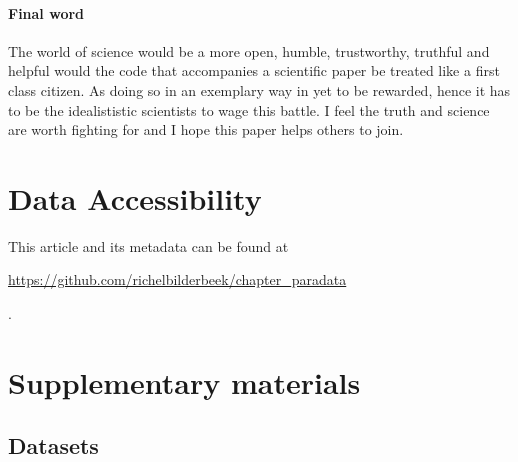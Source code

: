 \paragraph{Final word}

The world of science would be a more open, humble, trustworthy, truthful
and helpful would the code that accompanies a scientific paper
be treated like a first class citizen. As doing so in an exemplary way
in yet to be rewarded, hence it has to be the idealististic scientists
to wage this battle. I feel the truth and science are worth fighting for
and I hope this paper helps others to join.

\section{Data Accessibility}

This article and its metadata can be found at 
\begin{sloppypar}\url{https://github.com/richelbilderbeek/chapter_paradata}\end{sloppypar}.




\newpage
\appendix
\section{Supplementary materials}

\renewcommand{\thefigure}{S\arabic{figure}}
\setcounter{figure}{0}

\renewcommand{\thetable}{S\arabic{table}}
\setcounter{table}{0}

\subsection{Datasets}


